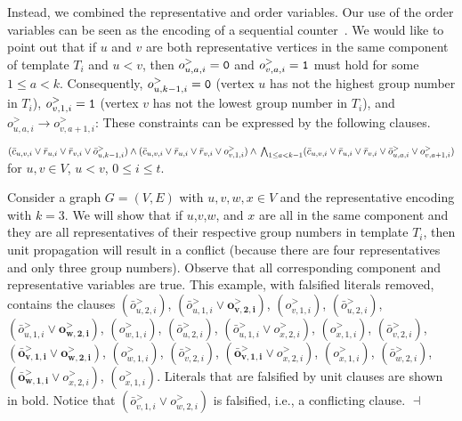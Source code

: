 \documentclass[10pt,usletter]{article}
\newenvironment{myquote}{\begin{center}
    \begin{minipage}{.80\linewidth}}{\end{minipage}\end{center}}
\theoremstyle{remark}
\newtheorem{example}{Example}
\renewenvironment{example}{\begin{ex}}{\hfill
    $\dashv$\end{ex}\medskip}
\begin{document}
Instead, we combined the representative and order variables.  Our use
of the order variables can be seen as the encoding of a sequential
counter~\cite{Sinz05}.  We would like to point out that if $u$ and $v$
are both representative vertices in the same component of template
$T_i$ and $u < v$, then $o^>_{u,a,i} = {\tt 0}$ and $o^>_{v,a,i} =
{\tt 1}$ must hold for some $1\leq a < k$.  Consequently,
$o^>_{u,k-1,i} = {\tt 0}$ (vertex $u$ has not the highest group number
in $T_i$), \mbox{$o^>_{v,1,i} = {\tt 1}$} (vertex $v$ has not the
lowest group number in $T_i$), and \mbox{$o^>_{u,a,i} \rightarrow
  o^>_{v,a+1,i}$}:
These constraints can be expressed by the following clauses.
\begin{myquote}
  $(\bar c_{u,v,i} \lor \bar r_{u,i} \lor \bar r_{v,i} \lor \bar o^>_{u,k-1,i}) \land (\bar c_{u,v,i} \lor \bar r_{u,i} \lor \bar r_{v,i} \lor o^>_{v,1,i}) \land \\
  \bigwedge_{1 \leq a < k-1} (\bar c_{u,v,i} \lor \bar r_{u,i} \lor
  \bar r_{v,i} \lor \bar o^>_{u,a,i} \lor o^>_{v,a+1,i})$\quad for $u,v \in V$, $u < v$, $0 \leq i \leq t$.
\end{myquote}





\begin{example}
  Consider a graph $G = (V,E)$ with $u,v,w,x \in V$ and the representative encoding with $k=3$.
  We will show that if $u$,$v$,$w$, and $x$ are all
  in the same component and they are all
  representatives of their respective group numbers in template $T_i$, 
  then unit propagation will result in a conflict (because there are four
  representatives and only three group numbers).  Observe that 
   all corresponding component and representative variables are true. 
  This example, with falsified literals removed, contains the clauses
    $(\bar o^>_{u,2,i}) $, 
    $ ( \bar o^>_{u,1,i} \lor \bm{o^>_{v,2,i}})$, 
    $ (o^>_{v,1,i}) $, $ (\bar o^>_{u,2,i}) $, 
    $ (\bar o^>_{u,1,i} \lor \bm{o^>_{w,2,i}}) $, 
    $ (o^>_{w,1,i}) $, 
    $(\bar o^>_{u,2,i}) $, 
    $ (\bar o^>_{u,1,i} \lor o^>_{x,2,i} ) $, 
    $(o^>_{x,1,i})$, 
    $(\bar o^>_{v,2,i})$, 
    \mbox{$ (\bm{\bar o^>_{v,1,i}} \lor \bm{o^>_{w,2,i}})$}, 
    $ (o^>_{w,1,i}) $, 
    $(\bar o^>_{v,2,i}) $, 
    $ (\bm{\bar o^>_{v,1,i}} \lor o^>_{x,2,i}) $, 
    $(o^>_{x,1,i}) $, 
    $(\bar o^>_{w,2,i}) $, 
    $ (\bm{\bar o^>_{w,1,i}} \lor o^>_{x,2,i}) $, 
    $ (o^>_{x,1,i})$.
Literals that are falsified by unit clauses are shown in bold. 
Notice that $({\bar o^>_{v,1,i} \lor {o^>_{w,2,i}}})$ is falsified, i.e., a conflicting clause.
\end{example}
\end{document}
